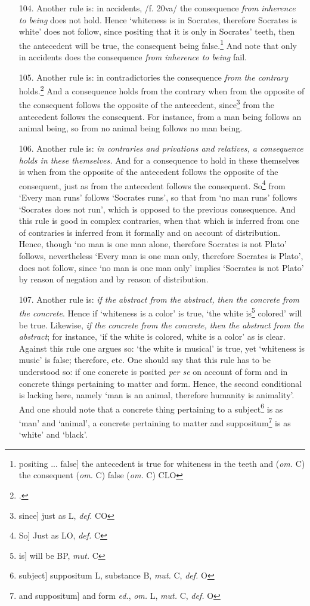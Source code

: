 \begin{itemize}
\item[104.] Another rule is: in accidents, /f. 20va/ the consequence \textit{from inherence to being} does not hold. Hence `whiteness is in Socrates, therefore Socrates is white' does not follow, since positing that it is only in Socrates' teeth, then the antecedent will be true, the consequent being false.\footnote{positing ... false] the antecedent is true for whiteness in the teeth and (\textit{om.} C) the consequent (\textit{om.} C) false (\textit{om.} C) CLO} And note that only in accidents does the consequence \textit{from inherence to being} fail. 
\item[105.] Another rule is: in contradictories the consequence \textit{from the contrary} holds.\footnote{\cite[p. 64.20]{BurleyDPAL}.} And a consequence holds from the contrary when from the opposite of the consequent follows the opposite of the antecedent, since\footnote{since] just as L, \textit{def.} CO} from the antecedent follows the consequent. For instance, from a man being follows an animal being, so from no animal being follows no man being.
\item[106.] Another rule is: \textit{in contraries and privations and relatives, a consequence holds in these themselves.} And for a consequence to hold in these themselves is when from the opposite of the antecedent follows the opposite of the consequent, just as from the antecedent follows the consequent. So\footnote{So] Just as LO, \textit{def.} C} from `Every man runs' follows `Socrates runs', so that from `no man runs' follows `Socrates does not run', which is opposed to the previous consequence. And this rule is good in complex contraries, when that which is inferred from one of contraries is inferred from it formally and on account of distribution. Hence, though `no man is one man alone, therefore Socrates is not Plato' follows, nevertheless `Every man is one man only, therefore Socrates is Plato', does not follow, since `no man is one man only' implies `Socrates is not Plato' by reason of negation and by reason of distribution.
\item[107.] Another rule is: \textit{if the abstract from the abstract, then the concrete from the concrete}. Hence if `whiteness is a color' is true, `the white is\footnote{is] will be BP, \textit{mut.} C} colored' will be true. Likewise, \textit{if the concrete from the concrete, then the abstract from the abstract}; for instance, `if the white is colored, white is a color' as is clear. Against this rule one argues so: `the white is musical' is true, yet `whiteness is music' is false; therefore, etc. One should say that this rule has to be understood so: if one concrete is posited \textit{per se} on account of form and in concrete things pertaining to matter and form. Hence, the second conditional is lacking here, namely `man is an animal, therefore humanity is animality'. And one should note that a concrete thing pertaining to a subject\footnote{subject] suppositum L, substance B, \textit{mut.} C, \textit{def.} O} is as `man' and `animal', a concrete pertaining to matter and suppositum\footnote{and suppositum] and form \textit{ed.}, \textit{om.} L, \textit{mut.} C, \textit{def.} O} is as `white' and `black'.

\end{itemize}
